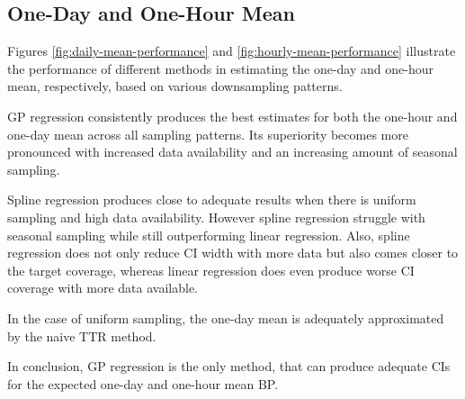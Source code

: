 \subsection{One-Day and One-Hour Mean}

Figures \ref{fig:daily-mean-performance} and \ref{fig:hourly-mean-performance}
illustrate the performance of different methods in estimating the one-day and one-hour mean,
respectively, based on various downsampling patterns.

GP regression consistently produces the best estimates for both the one-hour and
one-day mean across all sampling patterns.
Its superiority becomes more pronounced with increased data availability and
an increasing amount of seasonal sampling.

Spline regression produces close to adequate results when there is uniform sampling
and high data availability.
However spline regression struggle with seasonal sampling while still
outperforming linear regression. Also, spline regression does not
only reduce CI width with more data but also
comes closer to the target coverage, whereas linear regression does even
produce worse CI coverage with more data available.

In the case of uniform sampling, the one-day mean is adequately approximated
by the naive TTR method.

In conclusion, GP regression is the only method, that can produce
adequate CIs for the expected one-day and one-hour mean BP.



